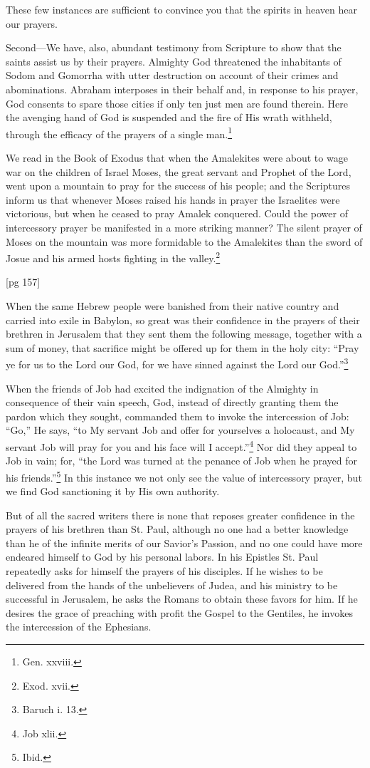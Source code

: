 These few instances are sufficient to convince
you that the spirits in heaven hear our prayers.

Second—We have, also, abundant testimony
from Scripture to show that the saints assist us
by their prayers. Almighty God threatened the
inhabitants of Sodom and Gomorrha with utter destruction
on account of their crimes and abominations.
Abraham interposes in their behalf and, in
response to his prayer, God consents to spare those
cities if only ten just men are found therein. Here
the avenging hand of God is suspended and the fire
of His wrath withheld, through the efficacy of the
prayers of a single man.\footnote{Gen. xxviii.}

We read in the Book of Exodus that when the
Amalekites were about to wage war on the children
of Israel Moses, the great servant and Prophet
of the Lord, went upon a mountain to pray for the
success of his people; and the Scriptures inform
us that whenever Moses raised his hands in prayer
the Israelites were victorious, but when he ceased
to pray Amalek conquered. Could the power of
intercessory prayer be manifested in a more striking
manner? The silent prayer of Moses on the
mountain was more formidable to the Amalekites
than the sword of Josue and his armed hosts fighting
in the valley.\footnote{Exod. xvii.}

[pg 157]

When the same Hebrew people were banished
from their native country and carried into exile in
Babylon, so great was their confidence in the prayers
of their brethren in Jerusalem that they sent
them the following message, together with a sum
of money, that sacrifice might be offered up for
them in the holy city: “Pray ye for us to the Lord
our God, for we have sinned against the Lord our
God.”\footnote{Baruch i. 13.}

When the friends of Job had excited the indignation
of the Almighty in consequence of their
vain speech, God, instead of directly granting them
the pardon which they sought, commanded them to
invoke the intercession of Job: “Go,” He says,
“to My servant Job and offer for yourselves a
holocaust, and My servant Job will pray for you
and his face will I accept.”\footnote{Job
xlii.} Nor did they appeal
to Job in vain; for, “the Lord was turned at the
penance of Job when he prayed for his friends.”\footnote{Ibid.}
In this instance we not only see the value of intercessory
prayer, but we find God sanctioning it by
His own authority.

But of all the sacred writers there is none that
reposes greater confidence in the prayers of his
brethren than St. Paul, although no one had a better
knowledge than he of the infinite merits of our
Savior's Passion, and no one could have more endeared
himself to God by his personal labors. In
his Epistles St. Paul repeatedly asks for himself
the prayers of his disciples. If he wishes to be
delivered from the hands of the unbelievers of
Judea, and his ministry to be successful in Jerusalem,
he asks the Romans to obtain these favors for
him. If he desires the grace of preaching with
profit the Gospel to the Gentiles, he invokes the
intercession of the Ephesians.


